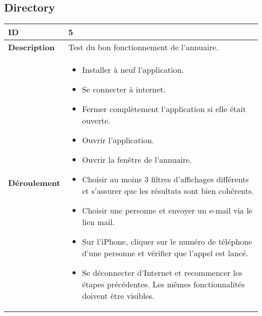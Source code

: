 		\subsection{Directory}
					 \begin{longtable}{m{4cm}|p{10cm}|}
					 \textbf{ ID} & 5 \\
					 \hline \textbf{Description} & Test du bon fonctionnement de l'annuaire.\\
					 \hline \textbf{Déroulement} &
						 \begin{itemize}
						  	\item Installer à neuf l'application.
						  	\item Se connecter à internet.
							 \item Fermer complètement l'application si elle était ouverte.
							 \item Ouvrir l'application.
							 \item Ouvrir la fenêtre de l'annuaire.
							 \item Choisir au moins 3 filtres d'affichages différents et s'assurer que les résultats sont bien cohérents. 
							 \item Choisir une personne et envoyer un e-mail via le lien mail.
							 \item Sur l'iPhone, cliquer sur le numéro de téléphone d'une personne et vérifier que l'appel est lancé.
							\item Se déconnecter d'Internet et recommencer les étapes précédentes. Les mêmes fonctionnalités doivent être visibles.
						 \end{itemize}
					 \\
				 \end{longtable} 
				 
